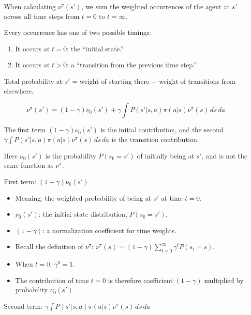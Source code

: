 When calculating \(\nu^\pi(s')\), we sum the weighted occurrences of the agent at \(s'\) across all time steps from \(t=0\) to \(t=\infty\).

Every occurrence has one of two possible timings:

\begin{enumerate}
\def\labelenumi{\arabic{enumi}.}
\tightlist
\item
  It occurs at \(t=0\): the ``initial state.''
\item
  It occurs at \(t>0\): a ``transition from the previous time step.''
\end{enumerate}

Total probability at \(s'\) = weight of starting there + weight of transitions from elsewhere.

\[
\nu^\pi(s') = (1-\gamma)\nu_0(s') + \gamma\int P(s'|s,a)\pi(a|s)\nu^\pi(s)\,ds\,da
\]

The first term \((1-\gamma)\nu_0(s')\) is the initial contribution, and the second \(\gamma\int P(s'|s,a)\pi(a|s)\nu^\pi(s)\,ds\,da\) is the transition contribution.

Here \(\nu_0(s')\) is the probability \(P(s_0=s')\) of initially being at \(s'\), and is not the same function as \(\nu^\pi\).

First term: \((1-\gamma)\nu_0(s')\)

\begin{itemize}
\tightlist
\item
  Meaning: the weighted probability of being at \(s'\) at time \(t=0\).
\item
  \(\nu_0(s')\): the initial-state distribution, \(P(s_0=s')\).
\item
  \((1-\gamma)\): a normalization coefficient for time weights.
\item
  Recall the definition of \(\nu^\pi\): \(\nu^\pi(s)=(1-\gamma)\sum_{t=0}^{\infty}\gamma^t P(s_t=s)\).
\item
  When \(t=0\), \(\gamma^0=1\).
\item
  The contribution of time \(t=0\) is therefore coefficient \((1-\gamma)\) multiplied by probability \(\nu_0(s')\).
\end{itemize}

Second term: \(\gamma\int P(s'|s,a)\pi(a|s)\nu^\pi(s)\,ds\,da\)

